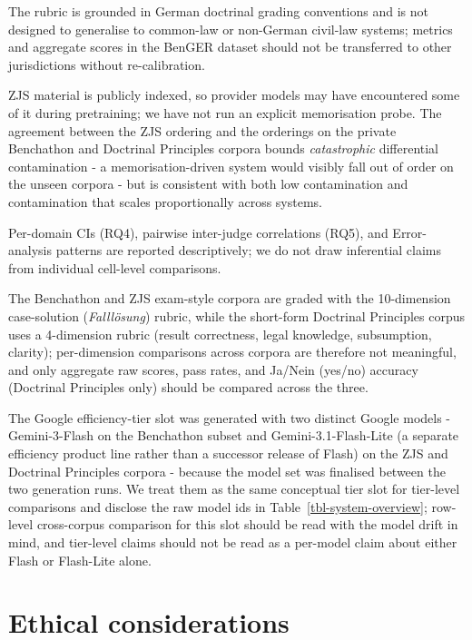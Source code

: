 \documentclass[11pt]{article}
\begin{document}
The rubric is grounded in German doctrinal grading conventions and is
not designed to generalise to common-law or non-German civil-law
systems; metrics and aggregate scores in the BenGER dataset should not
be transferred to other jurisdictions without re-calibration.

ZJS material is publicly indexed, so provider models may have
encountered some of it during pretraining; we have not run an explicit
memorisation probe. The agreement between the ZJS ordering and the
orderings on the private Benchathon and Doctrinal Principles corpora
bounds \emph{catastrophic} differential contamination - a
memorisation-driven system would visibly fall out of order on the unseen
corpora - but is consistent with both low contamination and
contamination that scales proportionally across systems.

Per-domain CIs (RQ4), pairwise inter-judge correlations (RQ5), and
Error-analysis patterns are reported descriptively; we do not draw
inferential claims from individual cell-level comparisons.

The Benchathon and ZJS exam-style corpora are graded with the
10-dimension case-solution (\emph{Falllösung}) rubric, while the
short-form Doctrinal Principles corpus uses a 4-dimension rubric (result
correctness, legal knowledge, subsumption, clarity); per-dimension
comparisons across corpora are therefore not meaningful, and only
aggregate raw scores, pass rates, and Ja/Nein (yes/no) accuracy
(Doctrinal Principles only) should be compared across the three.

The Google efficiency-tier slot was generated with two distinct Google
models - Gemini-3-Flash on the Benchathon subset and
Gemini-3.1-Flash-Lite (a separate efficiency product line rather than a
successor release of Flash) on the ZJS and Doctrinal Principles corpora
- because the model set was finalised between the two generation runs.
We treat them as the same conceptual tier slot for tier-level
comparisons and disclose the raw model ids in
Table~\ref{tbl-system-overview}; row-level cross-corpus comparison for
this slot should be read with the model drift in mind, and tier-level
claims should not be read as a per-model claim about either Flash or
Flash-Lite alone.

\section*{Ethical considerations}\label{ethical-considerations}
\end{document}

